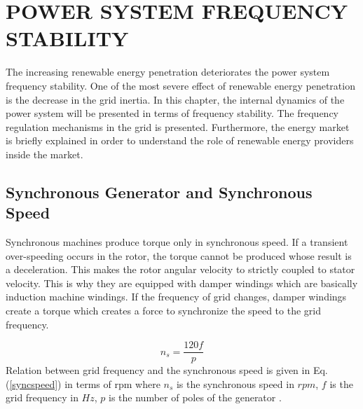 \chapter{POWER SYSTEM FREQUENCY STABILITY}
\label{chp:2}
The increasing renewable energy penetration deteriorates the power system frequency stability. One of the most severe effect of renewable energy penetration is the decrease in the grid inertia. In this chapter, the internal dynamics of the power system will be presented in terms of frequency stability. The frequency regulation mechanisms in the grid is presented. Furthermore, the energy market is briefly explained in order to understand the role of renewable energy providers inside the market.
\section{Synchronous Generator and Synchronous Speed}
Synchronous machines produce torque only in synchronous speed. If a transient over-speeding occurs in the rotor, the torque cannot be produced whose result is a deceleration. This makes the rotor angular velocity to strictly coupled to stator velocity. This is why they are equipped with damper windings which are basically induction machine windings. If the frequency of  grid changes, damper windings create a torque which creates a force to synchronize the speed to the grid frequency. \par
\begin{equation}
n_{s}=\frac{120f}{p}
\label{syncspeed}
\end{equation}
Relation between grid frequency and the synchronous speed is given in Eq. (\ref{syncspeed}) in terms of rpm where $n_{s}$ is the synchronous speed in $rpm$, $f$ is the grid frequency in $Hz$, $p$ is the number of poles of the generator \cite{Kundur}.

